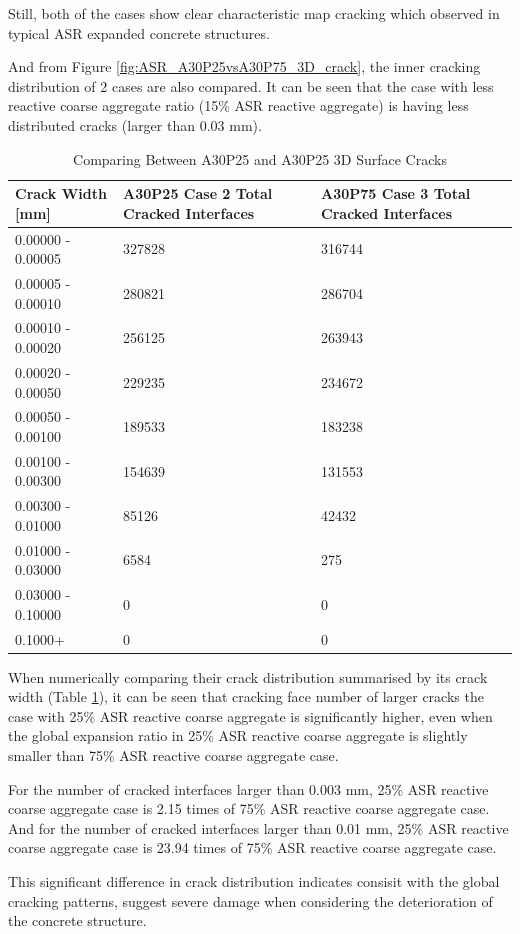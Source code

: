 Still, both of the cases show clear characteristic map cracking which observed in typical ASR expanded concrete structures.

And from Figure \ref{fig:ASR_A30P25vsA30P75_3D_crack}, the inner cracking distribution of 2 cases are also compared. It can be seen that the case with less reactive coarse aggregate ratio (15\% ASR reactive aggregate) is having less distributed cracks (larger than 0.03 mm).



\begin{table}[!h]
  \caption{Comparing Between A30P25 and A30P25 3D Surface Cracks}
\centering
\begin{tabular}{ ||p{4cm}|p{4cm}|p{4cm}|| }
\hline
 Crack Width [mm] &  A30P25 Case 2 Total Cracked Interfaces &  A30P75 Case 3 Total Cracked Interfaces \\
 \hline\hline

   0.00000 - 0.00005 & 327828 & 316744 \\
   0.00005 - 0.00010 & 280821 & 286704 \\
   0.00010 - 0.00020 & 256125 & 263943 \\
   0.00020 - 0.00050 & 229235 & 234672 \\
   0.00050 - 0.00100 & 189533 & 183238 \\
   0.00100 - 0.00300 & 154639 & 131553 \\
   0.00300 - 0.01000 & 85126 & 42432 \\
   0.01000 - 0.03000 & 6584 & 275 \\
   0.03000 - 0.10000 & 0 & 0 \\
   0.1000+ & 0 & 0 \\

  \hline
  \end{tabular}

\label{table:A30P25_2_vsA30P75_3_Cracks}
\end{table}

When numerically comparing their crack distribution summarised by its crack width (Table \ref{table:A30P25_2_vsA30P75_3_Cracks}),  it can be seen that cracking face number of larger cracks the case with 25\% ASR reactive coarse aggregate is significantly higher, even when the global expansion ratio in 25\% ASR reactive coarse aggregate is slightly smaller than 75\% ASR reactive coarse aggregate case.

For the number of cracked interfaces larger than 0.003 mm, 25\% ASR reactive coarse aggregate case is 2.15 times of 75\% ASR reactive coarse aggregate case. And for the number of cracked interfaces larger than 0.01 mm, 25\% ASR reactive coarse aggregate case is 23.94 times of 75\% ASR reactive coarse aggregate case.

This significant difference in crack distribution indicates consisit with the global cracking patterns, suggest severe damage when considering the deterioration of the concrete structure.
